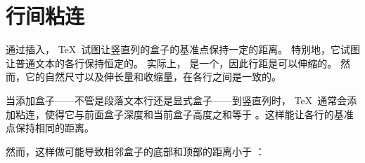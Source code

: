 \documentclass{book}
\begin{document}
\section{行间粘连}

%


通过插入，
\TeX\ 试图让竖直列的盒子的基准点保持一定的距离。
特别地，它试图让普通文本的各行保持恒定的。
实际上， 是一个，因此行距是可以伸缩的。
然而，它的自然尺寸以及伸长量和收缩量，在各行之间是一致的。

当添加盒子——不管是段落文本行还是显式盒子——到竖直列时，
\TeX\ 通常会添加粘连，使得它与前面盒子深度和当前盒子高度之和等于
。这样能让各行的基准点保持相同的距离。


\begin{quotation}
  \figone
\end{quotation}

然而，这样做可能导致相邻盒子的底部和顶部的距离小于 ：
\begin{quotation}
  \figtwo
\end{quotation}
\end{document}
